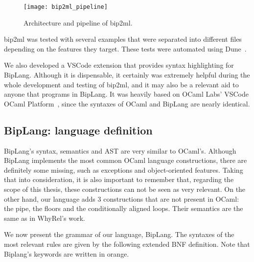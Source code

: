 \begin{figure}[htbp]
  \centering
  \texttt{[image: bip2ml\_pipeline]}
  \caption{Architecture and pipeline of bip2ml.}
  \label{fig:bip2ml_pipeline}
\end{figure}

bip2ml was tested with several examples that were separated into different files depending on the features they target.
These tests were automated using Dune~\cite{dune}.

We also developed a VSCode extension that provides syntax highlighting for BipLang.
Although it is dispensable, it certainly was extremely helpful during the whole development and testing of bip2ml, and it may also be a relevant aid to anyone that programs in BipLang.
It was heavily based on OCaml Labs' VSCode OCaml Platform~\cite{ocaml-platform}, since the syntaxes of OCaml and BipLang are nearly identical.


\FloatBarrier
\subsection{BipLang: language definition}
\label{subsec:lang_def}

BipLang's syntax, semantics and AST are very similar to OCaml's.
Although BipLang implements the most common OCaml language constructions, there are definitely some missing, such as exceptions and object-oriented features.
Taking that into consideration, it is also important to remember that, regarding the scope of this thesis, these constructions can not be seen as very relevant.
On the other hand, our language adds 3 constructions that are not present in OCaml: the pipe, the floors and the conditionally aligned loops.
Their semantics are the same as in WhyRel's work.

We now present the grammar of our language, BipLang.
The syntaxes of the most relevant rules are given by the following extended BNF definition.
Note that Biplang's keywords are written in orange.

